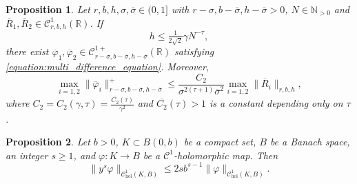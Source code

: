 \documentclass[10pt,a4paper]{amsart}
\newtheorem{proposition}{Proposition}
\newcommand{\C}{\mathbb{C}}
\newcommand{\N}{\mathbb{N}}
\newcommand{\R}{\mathbb{R}}
\newcommand{\T}{\mathbb{T}}
\begin{document}
\begin{proposition}
\label{proposition:solution_truncated_difference_equation}
Let $r,b,h,\sigma,\overline\sigma \in(0,1]$ with $r-\sigma,b-\overline\sigma,h-\overline\sigma>0$, $N \in \N_{> 0}$ and $\overline R_1, \overline R_2\in\mathscr C^1_{r,b,h}(\R)$. 
If 
\[
h \leq \tfrac{1}{2\sqrt 2}\gamma N^{-\tau},
\]
there exist $\overline \varphi_1, \overline \varphi_2\in\mathscr C^{1+}_{r-\sigma,b-\overline\sigma,h-\overline\sigma}(\R)$ satisfying \eqref{equation:multi_difference_equation}. Moreover,
 \begin{equation}
 \label{equation:norm_control_difference_equation}
  \max_{i=1,2}
 \|\overline \varphi_i\|^+_{r - \sigma, b - \overline \sigma, h - \overline \sigma} 
 \leq 
 \frac{C_2}{\sigma^{2(\tau+1)}\overline\sigma^2}
 \max_{i=1,2} 
 \|\overline R_i\|_{r, b, h},
 \end{equation}
where $C_2 = C_2(\gamma, \tau) = \tfrac{\overline{C_2}(\tau)}{\gamma^2}$ and $\overline{C_2}(\tau) > 1$ is a constant depending only on $\tau$.
\end{proposition}

\begin{proposition}
\label{proposition:norm_power_times_map}
Let $b>0$, $K\subset B(0,b)$ be a compact set, $B$ be a Banach space, an integer $s\geq 1$, and $\varphi:K\to B$ be a $\mathscr C^1$-holomorphic map. Then
$$\|y^s\varphi\|_{\mathscr C^1_{\text{hol}}(K,B)}\leq 2sb^{s-1}\|\varphi\|_{\mathscr C^1_{\text{hol}}(K,B)}.$$
\end{proposition}
\end{document}

